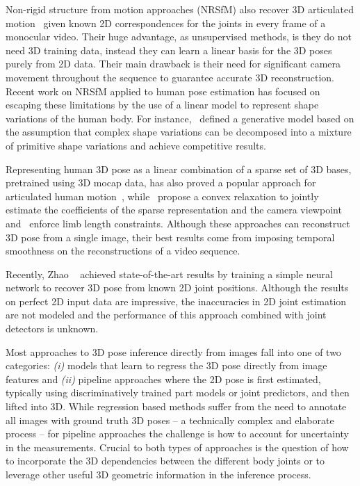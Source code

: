 \documentclass[10pt,twocolumn,letterpaper]{article}
\begin{document}
Non-rigid structure from motion approaches (NRSfM) also recover 3D
articulated
motion~\cite{bregler2000recovering,Akhter:etal:PAMI:2011,Gotardo:Martinez:PAMI:2012,Lee:etal:PAMI}
given known 2D correspondences for the joints in every frame of a
monocular video. Their huge advantage, as unsupervised methods, is
they do not need 3D training data, instead they can learn a linear
basis for the 3D poses purely from 2D data.
Their main drawback is their need for significant camera movement
throughout the sequence to guarantee accurate 3D
reconstruction.  Recent work on NRSfM applied to human pose estimation has
focused on escaping these limitations by the use of a linear
model to represent shape variations of the human body. For
instance,~\cite{cho2016complex} defined a generative
model based on the assumption that complex shape variations can be
decomposed into a mixture of primitive shape variations and achieve
competitive results.

Representing human 3D pose as a linear combination of a sparse set of
3D bases, pretrained using 3D mocap data, has also proved a popular
approach for articulated human
motion~\cite{ramakrishna2012reconstructing,
  Wang:etal:CVPR:2014,zhou2015sparse}, while~\cite{zhou2015sparse}
propose a convex relaxation to jointly estimate the coefficients of
the sparse representation and the camera
viewpoint~\cite{ramakrishna2012reconstructing}
and~\cite{Wang:etal:CVPR:2014} enforce limb length
constraints. Although these approaches can reconstruct 3D pose from a
single image, their best results come from imposing temporal
smoothness on the reconstructions of a video sequence.

Recently, Zhao \etal~\cite{zhao2016simple} achieved state-of-the-art
results by training a simple neural network to recover 3D pose from
known 2D joint positions. Although the results on perfect 2D input data
are impressive, the inaccuracies in 2D joint estimation are not
modeled and the performance of this approach combined with joint
detectors is unknown.
 

 Most approaches to 3D pose
inference directly from images fall into one of two categories:
\emph{(i)} models that learn to regress the 3D pose directly from
image features and \emph{(ii)} pipeline approaches where the 2D pose
is first estimated, typically using discriminatively trained part
models or joint predictors, and then lifted into 3D. While regression
based methods suffer from the need to annotate all images with ground
truth 3D poses -- a technically complex and elaborate process -- for
pipeline approaches the challenge is how to account for uncertainty in
the measurements.  Crucial to both types of approaches is the question
of how to incorporate the 3D dependencies between the different body
joints or to leverage other useful 3D geometric information in the
inference process.
\end{document}
